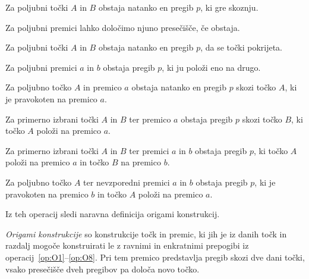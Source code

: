 \renewcommand{\theoperacija}{O\arabic{operacija}}

\begin{operacija}
    \label{op:O1}
    Za poljubni točki $A$ in $B$ obstaja natanko en pregib $p$, ki gre skoznju.
\end{operacija}
\begin{operacija}
    \label{op:O2}
    Za poljubni premici lahko določimo njuno presečišče, če obstaja.
\end{operacija}
\begin{operacija}
    \label{op:O3}
    Za poljubni točki $A$ in $B$ obstaja natanko en pregib $p$, da se točki pokrijeta.
\end{operacija}
\begin{operacija}
    \label{op:O4}
    Za poljubni premici $a$ in $b$ obstaja pregib $p$, ki ju položi eno na drugo.
\end{operacija}
\begin{operacija}
    \label{op:O5}
    Za poljubno točko $A$ in premico $a$ obstaja natanko en pregib $p$ skozi točko $A$, ki je pravokoten na premico $a$.
\end{operacija}
\begin{operacija}
    \label{op:O6}
    Za primerno izbrani točki $A$ in $B$ ter premico $a$ obstaja pregib $p$ skozi točko $B$, ki točko $A$ položi na premico $a$.
\end{operacija}
\begin{operacija}
    \label{op:O7}
    Za primerno izbrani točki $A$ in $B$ ter premici $a$ in $b$ obstaja pregib $p$, ki točko $A$ položi na premico $a$ in točko $B$ na premico $b$.
\end{operacija}
\begin{operacija}
    \label{op:O8}
    Za poljubno točko $A$ ter nevzporedni premici $a$ in $b$ obstaja pregib $p$, ki je pravokoten na premico $b$ in točko $A$ položi na premico $a$.
\end{operacija}

Iz teh operacij sledi naravna definicija origami konstrukcij.

\begin{definicija}
    \label{def:origami_konstruktibilnost}
    \emph{Origami konstrukcije} so konstrukcije točk in premic, ki jih je iz danih točk in razdalj mogoče konstruirati le z ravnimi in enkratnimi prepogibi iz operacij~\ref{op:O1}--\ref{op:O8}. Pri tem premico predstavlja pregib skozi dve dani točki, vsako presečišče dveh pregibov pa določa novo točko.
\end{definicija}

